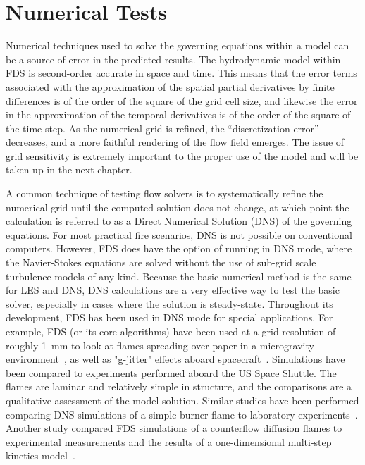 \documentclass[11pt]{book}
\begin{document}
\section{Numerical Tests}
\label{Numerical Tests}

Numerical techniques used to solve the governing equations within a
model can be a source of error in the predicted results.  The
hydrodynamic model within FDS is second-order accurate in space and
time.  This means that the error terms associated with the
approximation of the spatial partial derivatives by finite differences
is of the order of the square of the grid cell size, and likewise the
error in the approximation of the temporal derivatives is of the order
of the square of the time step. As the numerical grid is refined, the
``discretization error'' decreases, and a more faithful rendering of
the flow field emerges.  The issue of grid sensitivity is extremely
important to the proper use of the model and will be taken up in the
next chapter.

A common technique of testing flow solvers is to systematically refine
the numerical grid until the computed solution does not change, at
which point the calculation is referred to as a Direct Numerical
Solution (DNS) of the governing equations.  For most practical fire
scenarios, DNS is not possible on conventional computers. However, FDS
does have the option of running in DNS mode, where the Navier-Stokes
equations are solved without the use of sub-grid scale turbulence
models of any kind. Because the basic numerical method is the same for
LES and DNS, DNS calculations are a very effective way to test the
basic solver, especially in cases where the solution is steady-state.
Throughout its development, FDS has been used in DNS mode for special
applications.  For example, FDS (or its core algorithms) have been
used at a grid resolution of roughly 1~mm to look at flames spreading
over paper in a microgravity
environment~\cite{McGrattan:C&F1996,Kashiwagi:CS1996,Mell:CS98,Mell:CS00,Prasad:CS2002,Nakamura:C&F2002},
as well as "g-jitter" effects aboard spacecraft~\cite{Mell:g-jitter}.
Simulations have been compared to experiments performed aboard the US
Space Shuttle.  The flames are laminar and relatively simple in
structure, and the comparisons are a qualitative assessment of the
model solution. Similar studies have been performed comparing DNS
simulations of a simple burner flame to laboratory
experiments~\cite{Mukhopadhyay:1}. Another study compared FDS
simulations of a counterflow diffusion flames to experimental
measurements and the results of a one-dimensional multi-step kinetics
model~\cite{Hamins:NASA}.
\end{document}
